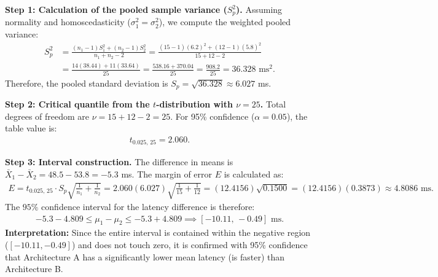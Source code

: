 \begin{solucion}
	\textbf{Step 1: Calculation of the pooled sample variance ($S_p^2$).}
	Assuming normality and homoscedasticity ($\sigma_1^2 = \sigma_2^2$), we compute the weighted pooled variance:
	\begin{align}
		S_p^2 &= \frac{(n_1 - 1)S_1^2 + (n_2 - 1)S_2^2}{n_1 + n_2 - 2} = \frac{(15 - 1)(6.2)^2 + (12 - 1)(5.8)^2}{15 + 12 - 2} \\
		&= \frac{14(38.44) + 11(33.64)}{25} = \frac{538.16 + 370.04}{25} = \frac{908.2}{25} = 36.328 \text{ ms}^2.
	\end{align}
	Therefore, the pooled standard deviation is $S_p = \sqrt{36.328} \approx 6.027$ ms.
	
	\textbf{Step 2: Critical quantile from the $t$-distribution with $\nu = 25$.}
	Total degrees of freedom are $\nu = 15 + 12 - 2 = 25$. For 95\% confidence ($\alpha = 0.05$), the table value is:
	\begin{align}
		t_{0.025, \, 25} = 2.060.
	\end{align}
	
	\textbf{Step 3: Interval construction.}
	The difference in means is $\bar{X}_1 - \bar{X}_2 = 48.5 - 53.8 = -5.3$ ms. The margin of error $E$ is calculated as:
	\begin{align}
		E = t_{0.025, \, 25} \cdot S_p \sqrt{\frac{1}{n_1} + \frac{1}{n_2}} = 2.060(6.027) \sqrt{\frac{1}{15} + \frac{1}{12}} = (12.4156) \sqrt{0.1500} = (12.4156)(0.3873) \approx 4.8086 \text{ ms.}
	\end{align}
	The $95\%$ confidence interval for the latency difference is therefore:
	\begin{align}
		-5.3 - 4.809 \le \mu_1 - \mu_2 \le -5.3 + 4.809 \implies [-10.11, \, -0.49] \text{ ms.}
	\end{align}
	\textbf{Interpretation:} Since the entire interval is contained within the negative region ($[-10.11, -0.49]$) and does not touch zero, it is confirmed with 95\% confidence that Architecture A has a significantly lower mean latency (is faster) than Architecture B.
\end{solucion}

